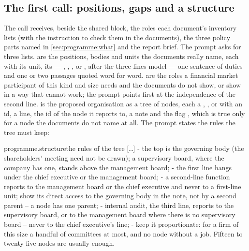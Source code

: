\subsection{The first call: positions, gaps and a structure}

The call receives, beside the shared block, the roles each document's inventory lists (with
the instruction to check them in the documents), the three policy parts named in
\cref{sec:programme:what} and the report brief. The prompt  asks
for three lists.  are the positions, bodies and units the documents really
name, each with its unit, its  --- , , ,
 or , after the three lines model --- one sentence of duties and one
or two passages quoted word for word.  are the roles a financial market
participant of this kind and size needs and the documents do not show, or show in a way that
cannot work; the prompt points first at the independence of the second line. 
is the proposed organisation as a tree of nodes, each a , ,
 or  with an id, a line, the id of the node it reports to, a note
and the flag , which is true only for a node the documents do not name at all.
The prompt states the rules the tree must keep:

\begin{promptexcerpt}{programme.structure}{the rules of the tree}
[…]
   - the top is the governing body (the shareholders' meeting need not be drawn); a supervisory board, where the company has one, stands above the management board;
   - the first line hangs under the chief executive or the management board;
   - a second-line function reports to the management board or the chief executive and never to a first-line unit; show its direct access to the governing body in the note, not by a second parent – a node has one parent;
   - internal audit, the third line, reports to the supervisory board, or to the management board where there is no supervisory board – never to the chief executive's line;
   - keep it proportionate: for a firm of this size a handful of committees at most, and no node without a job. Fifteen to twenty-five nodes are usually enough.
\end{promptexcerpt}

